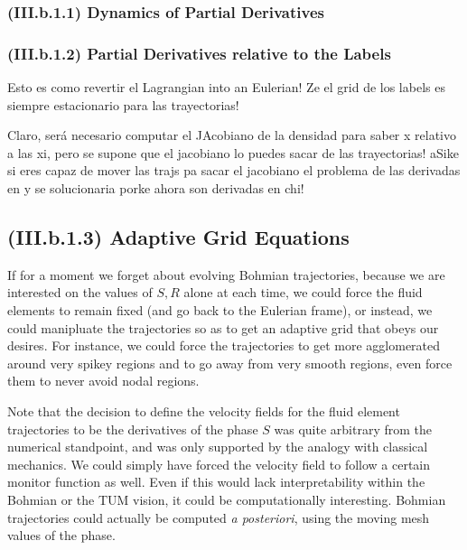 \documentclass[11pt, a4paper]{article} %
\begin{document}
\subsubsection*{(III.b.1.1) Dynamics of Partial Derivatives}

\subsubsection*{(III.b.1.2) Partial Derivatives relative to the Labels}

Esto es como revertir el Lagrangian into an Eulerian! Ze el grid de los labels es siempre estacionario para las trayectorias! 

Claro, será necesario computar el JAcobiano de la densidad para saber x relativo a las xi, pero se supone que el jacobiano lo puedes sacar de las trayectorias! aSike si eres capaz de mover las trajs pa sacar el jacobiano el problema de las derivadas en y se solucionaria porke ahora son derivadas en chi!

\subsection*{(III.b.1.3) Adaptive Grid Equations}

If for a moment we forget about evolving Bohmian trajectories, because we are interested on the values of $S,R$ alone at each time, we could force the fluid elements to remain fixed (and go back to the Eulerian frame), or instead, we could manipluate the trajectories so as to get an adaptive grid that obeys our desires. For instance, we could force the trajectories to get more agglomerated around very spikey regions and to go away from very smooth regions, even force them to never avoid nodal regions.

Note that the decision to define the velocity fields for the fluid element trajectories to be the derivatives of the phase $S$ was quite arbitrary from the numerical standpoint, and was only supported by the analogy with classical mechanics. We could  simply have forced the velocity field to follow a certain monitor function as well. Even if this would lack interpretability within the Bohmian or the TUM vision, it could be computationally interesting. Bohmian trajectories could actually be computed {\em a posteriori}, using the moving mesh values of the phase.
\end{document}
